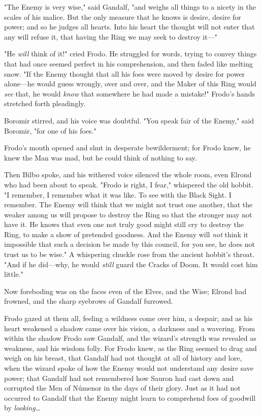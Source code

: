 "The Enemy is very wise," said Gandalf, "and weighs all things to a nicety in
the scales of his malice. But the only measure that he knows is desire, desire
for power; and so he judges all hearts. Into his heart the thought will not
enter that any will refuse it, that having the Ring we may seek to destroy
it---"

"He \emph{will} think of it!" cried Frodo. He struggled for words, trying to
convey things that had once seemed perfect in his comprehension, and then faded
like melting snow. "If the Enemy thought that all his foes were moved by desire
for power alone---he would guess wrongly, over and over, and the Maker of this
Ring would \emph{see} that, he would \emph{know} that somewhere he had made a
mistake!" Frodo's hands stretched forth pleadingly.

Boromir stirred, and his voice was doubtful. "You speak fair of the Enemy,"
said Boromir, "for one of his foes."

Frodo's mouth opened and shut in desperate bewilderment; for Frodo knew, he
knew the Man was mad, but he could think of nothing to say.

Then Bilbo spoke, and his withered voice silenced the whole room, even Elrond
who had been about to speak. "Frodo is right, I fear," whispered the old
hobbit. "I remember, I remember what it was like. To see with the Black Sight.
I remember. The Enemy will think that we might not trust one another, that the
weaker among us will propose to destroy the Ring so that the stronger may not
have it. He knows that even one not truly good might still cry to destroy the
Ring, to make a show of pretended goodness. And the Enemy will \emph{not} think
it impossible that such a decision be made by this council, for you see, he
does not trust us to be wise." A whispering chuckle rose from the ancient
hobbit's throat. "And if he did---why, he would \emph{still} guard the Cracks
of Doom. It would cost him little."

Now foreboding was on the faces even of the Elves, and the Wise; Elrond had
frowned, and the sharp eyebrows of Gandalf furrowed.

Frodo gazed at them all, feeling a wildness come over him, a despair; and as
his heart weakened a shadow came over his vision, a darkness and a wavering.
From within the shadow Frodo saw Gandalf, and the wizard's strength was
revealed as weakness, and his wisdom folly. For Frodo knew, as the Ring seemed
to drag and weigh on his breast, that Gandalf had not thought at all of history
and lore, when the wizard spoke of how the Enemy would not understand any
desire save power; that Gandalf had not remembered how Sauron had cast down and
corrupted the Men of Númenor in the days of their glory. Just as it had not
occurred to Gandalf that the Enemy might learn to comprehend foes of goodwill
by \emph{looking{\ldots}}

